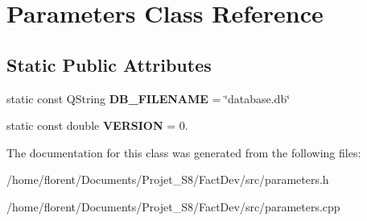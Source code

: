 \hypertarget{classParameters}{\section{Parameters Class Reference}
\label{classParameters}
}
\subsection*{Static Public Attributes}
\begin{DoxyCompactItemize}
\item 
\hypertarget{classParameters_a80b98bd51d910bcc2203afcacbc7df87}{static const Q\-String {\bfseries D\-B\-\_\-\-F\-I\-L\-E\-N\-A\-M\-E} = \char`\"{}database.\-db\char`\"{}}\label{classParameters_a80b98bd51d910bcc2203afcacbc7df87}

\item 
\hypertarget{classParameters_a279ee24140c761de46178daa8960bdc8}{static const double {\bfseries V\-E\-R\-S\-I\-O\-N} = 0.}\label{classParameters_a279ee24140c761de46178daa8960bdc8}

\end{DoxyCompactItemize}


The documentation for this class was generated from the following files\-:\begin{DoxyCompactItemize}
\item 
/home/florent/\-Documents/\-Projet\-\_\-\-S8/\-Fact\-Dev/src/parameters.\-h\item 
/home/florent/\-Documents/\-Projet\-\_\-\-S8/\-Fact\-Dev/src/parameters.\-cpp\end{DoxyCompactItemize}
